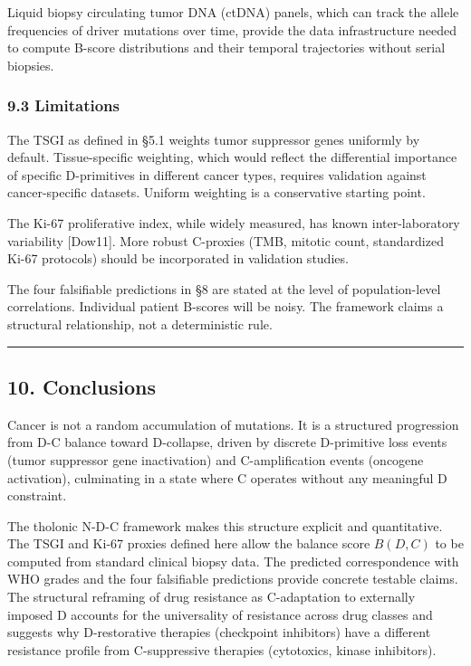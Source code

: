 \documentclass[
  11pt,
  letterpaper,
]{article}
\begin{document}
Liquid biopsy circulating tumor DNA (ctDNA) panels, which can track the
allele frequencies of driver mutations over time, provide the data
infrastructure needed to compute B-score distributions and their
temporal trajectories without serial biopsies.

\subsubsection{9.3 Limitations}\label{limitations}

The TSGI as defined in §5.1 weights tumor suppressor genes uniformly by
default. Tissue-specific weighting, which would reflect the differential
importance of specific D-primitives in different cancer types, requires
validation against cancer-specific datasets. Uniform weighting is a
conservative starting point.

The Ki-67 proliferative index, while widely measured, has known
inter-laboratory variability {[}Dow11{]}. More robust C-proxies (TMB,
mitotic count, standardized Ki-67 protocols) should be incorporated in
validation studies.

The four falsifiable predictions in §8 are stated at the level of
population-level correlations. Individual patient B-scores will be
noisy. The framework claims a structural relationship, not a
deterministic rule.

\begin{center}\rule{0.5\linewidth}{0.5pt}\end{center}

\subsection{10. Conclusions}\label{conclusions}

Cancer is not a random accumulation of mutations. It is a structured
progression from D-C balance toward D-collapse, driven by discrete
D-primitive loss events (tumor suppressor gene inactivation) and
C-amplification events (oncogene activation), culminating in a state
where C operates without any meaningful D constraint.

The tholonic N-D-C framework makes this structure explicit and
quantitative. The TSGI and Ki-67 proxies defined here allow the balance
score \(B(D,C)\) to be computed from standard clinical biopsy data. The
predicted correspondence with WHO grades and the four falsifiable
predictions provide concrete testable claims. The structural reframing
of drug resistance as C-adaptation to externally imposed D accounts for
the universality of resistance across drug classes and suggests why
D-restorative therapies (checkpoint inhibitors) have a different
resistance profile from C-suppressive therapies (cytotoxics, kinase
inhibitors).
\end{document}
